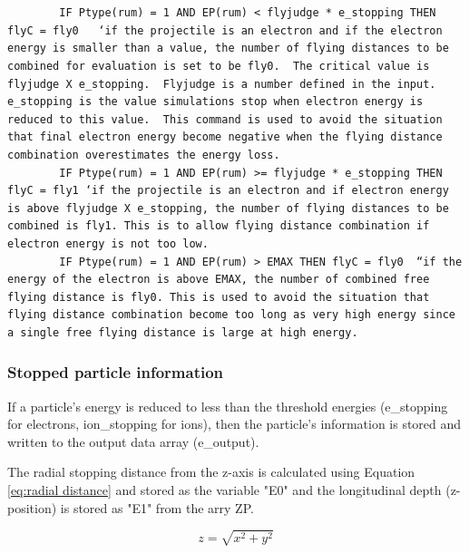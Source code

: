 \documentclass[10pt, reqno]{exam}
\begin{document}
\begin{verbatim}

    
        IF Ptype(rum) = 1 AND EP(rum) < flyjudge * e_stopping THEN flyC = fly0   ‘if the projectile is an electron and if the electron energy is smaller than a value, the number of flying distances to be combined for evaluation is set to be fly0.  The critical value is flyjudge X e_stopping.  Flyjudge is a number defined in the input. e_stopping is the value simulations stop when electron energy is reduced to this value.  This command is used to avoid the situation that final electron energy become negative when the flying distance combination overestimates the energy loss. 
        IF Ptype(rum) = 1 AND EP(rum) >= flyjudge * e_stopping THEN flyC = fly1 ‘if the projectile is an electron and if electron energy is above flyjudge X e_stopping, the number of flying distances to be combined is fly1. This is to allow flying distance combination if electron energy is not too low.
        IF Ptype(rum) = 1 AND EP(rum) > EMAX THEN flyC = fly0  “if the energy of the electron is above EMAX, the number of combined free flying distance is fly0. This is used to avoid the situation that flying distance combination become too long as very high energy since a single free flying distance is large at high energy. 
\end{verbatim}
\subsubsection{Stopped particle information}
\label{sec:stopped particle}
If a particle's energy is reduced to less than the threshold energies (e\_stopping for electrons, ion\_stopping for ions), then the particle's information is stored and written to the output data array (e\_output). \par

The radial stopping distance from the z-axis is calculated using Equation \ref{eq:radial distance} and stored as the variable "E0" and the longitudinal depth (z-position) is stored as "E1" from the arry ZP. \par

\begin{equation}
    z = \sqrt{x^2 + y^2} 
    \label{eq:radial distance}
\end{equation}
\end{document}
